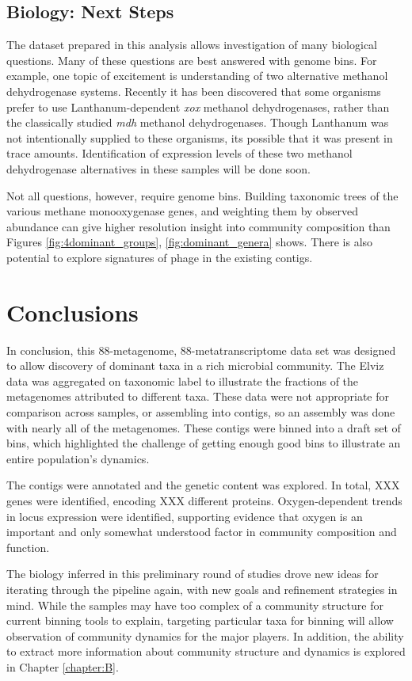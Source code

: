 \subsection{Biology: Next Steps}

The dataset prepared in this analysis allows investigation of many biological questions.
Many of these questions are best answered with genome bins.
For example, one topic of excitement is understanding of two alternative methanol dehydrogenase systems.
Recently it has been discovered that some organisms prefer to use Lanthanum-dependent \textit{xox} methanol dehydrogenases, rather than the classically studied \textit{mdh} methanol dehydrogenases. %
Though Lanthanum was not intentionally supplied to these organisms, its possible that it was present in trace amounts.
Identification of expression levels of these two methanol dehydrogenase alternatives in these samples will be done soon.

Not all questions, however, require genome bins.
Building taxonomic trees of the various methane monooxygenase genes, and weighting them by observed abundance can give higher resolution insight into community composition than Figures \ref{fig:4dominant_groups}, \ref{fig:dominant_genera} shows.
There is also potential to explore signatures of phage in the existing contigs.


\section{Conclusions}

In conclusion, this 88-metagenome, 88-metatranscriptome data set was designed to allow discovery of dominant taxa in a rich microbial community.
The Elviz data was aggregated on taxonomic label to illustrate the fractions of the metagenomes attributed to different taxa.
These data were not appropriate for comparison across samples, or assembling into contigs, so an assembly was done with nearly all of the metagenomes.
These contigs were binned into a draft set of bins, which highlighted the challenge of getting enough good bins to illustrate an entire population's dynamics.

The contigs were annotated and the genetic content was explored.
In total, XXX genes were identified, encoding XXX different proteins.
Oxygen-dependent trends in locus expression were identified, supporting evidence that oxygen is an important and only somewhat understood factor in community composition and function.

The biology inferred in this preliminary round of studies drove new ideas for iterating through the pipeline again, with new goals and refinement strategies in mind.
While the samples may have too complex of a community structure for current binning tools to explain, targeting particular taxa for binning will allow observation of community dynamics for the major players.
In addition, the ability to extract more information about community structure and dynamics is explored in Chapter \ref{chapter:B}.


